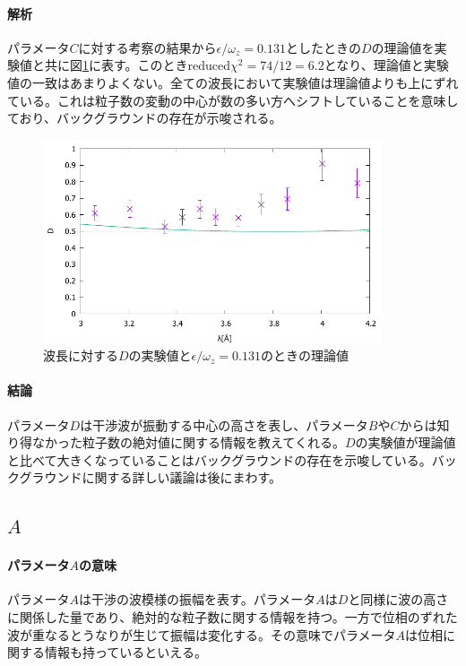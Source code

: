 \paragraph{解析}
パラメータ$C$に対する考察の結果から$\epsilon/\omega_z=0.131$としたときの$D$の理論値を実験値と共に図\ref{Discussion_fig_D_N1}に表す。このときreduced$\chi^2=74/12=6.2$となり、理論値と実験値の一致はあまりよくない。全ての波長において実験値は理論値よりも上にずれている。これは粒子数の変動の中心が数の多い方へシフトしていることを意味しており、バックグラウンドの存在が示唆される。
\begin{figure}[h]
\centering
\includegraphics[width=10cm]{discussion/D/D_F_N1.pdf}
\caption{波長に対する$D$の実験値と$\epsilon/\omega_z=0.131$のときの理論値}\label{Discussion_fig_D_N1}
\end{figure}

\paragraph{結論}
パラメータ$D$は干渉波が振動する中心の高さを表し、パラメータ$B$や$C$からは知り得なかった粒子数の絶対値に関する情報を教えてくれる。$D$の実験値が理論値と比べて大きくなっていることはバックグラウンドの存在を示唆している。バックグラウンドに関する詳しい議論は後にまわす。

\subsection{$A$}
\paragraph{パラメータ$A$の意味}
パラメータ$A$は干渉の波模様の振幅を表す。パラメータ$A$は$D$と同様に波の高さに関係した量であり、絶対的な粒子数に関する情報を持つ。一方で位相のずれた波が重なるとうなりが生じて振幅は変化する。その意味でパラメータ$A$は位相に関する情報も持っているといえる。

